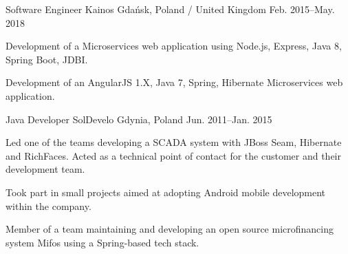 \begin{cventries}
  \cventry
    {Software Engineer} %
    {Kainos} %
    {Gdańsk, Poland / United Kingdom} %
    {Feb. 2015–May. 2018} %
    {
      \begin{cvitems} %
        \item {Development of a Microservices web application using Node.js, Express, Java 8, Spring Boot, JDBI.}
        \item {Development of an AngularJS 1.X, Java 7, Spring, Hibernate Microservices web application.}
      \end{cvitems}
    }

  \cventry
    {Java Developer} %
    {SolDevelo} %
    {Gdynia, Poland} %
    {Jun. 2011–Jan. 2015} %
    {
      \begin{cvitems} %
        \item {Led one of the teams developing a SCADA system with JBoss Seam, Hibernate and RichFaces. Acted as a technical point of contact for the customer and their development team.}
        \item {Took part in small projects aimed at adopting Android mobile development within the company.}
        \item {Member of a team maintaining and developing an open source microfinancing system Mifos using a Spring-based tech stack.}
      \end{cvitems}
    }

\end{cventries}
